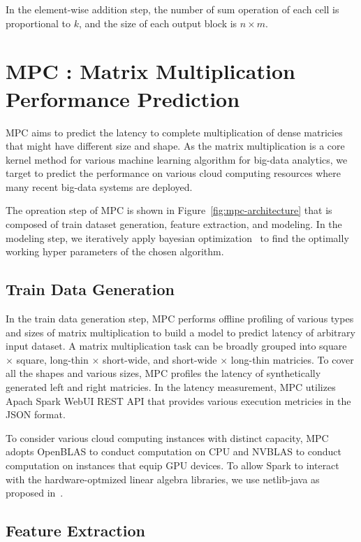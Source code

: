 \documentclass[10pt, conference, compsocconf]{IEEEtran}
\begin{document}
In the element-wise addition step, the number of sum operation of each cell is proportional to $k$, and the size of each output block is $n \times m$.

\section{MPC : Matrix Multiplication Performance Prediction}
MPC aims to predict the latency to complete multiplication of dense matricies that might have different size and shape. As the matrix multiplication is a core kernel method for various machine learning algorithm for big-data analytics, we target to predict the performance on various cloud computing resources where many recent big-data systems are deployed.


The opreation step of MPC is shown in Figure~\ref{fig:mpc-architecture} that is composed of train dataset generation, feature extraction, and modeling. In the modeling step, we iteratively apply bayesian optimization~\cite{bayesian-optimization} to find the optimally working hyper parameters of the chosen algorithm.

\subsection{Train Data Generation}
In the train data generation step, MPC performs offline profiling of various types and sizes of matrix multiplication to build a model to predict latency of arbitrary input dataset. A matrix multiplication task can be broadly grouped into square $\times$ square, long-thin $\times$ short-wide, and short-wide $\times$ long-thin matricies. To cover all the shapes and various sizes, MPC profiles the latency of synthetically generated left and right matricies. In the latency measurement, MPC utilizes Apach Spark WebUI REST API that provides various execution metricies in the JSON format.

To consider various cloud computing instances with distinct capacity, MPC adopts OpenBLAS to conduct computation on CPU and NVBLAS to conduct computation on instances that equip GPU devices. To allow Spark to interact with the hardware-optmized linear algebra libraries, we use netlib-java as proposed in~\cite{fatman-littleboy}.

\subsection{Feature Extraction}
\end{document}
